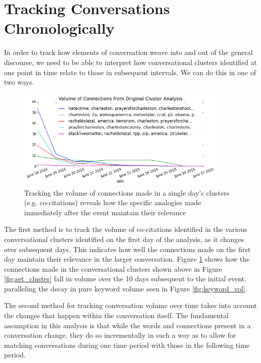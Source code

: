 \documentclass[12pt]{article}
\begin{document}
\section{Tracking Conversations Chronologically}
In order to track how elements of conversation weave into and out of the general discourse, we need to be able to interpret how conversational clusters identified at one point in time relate to those in subsequent intervals. We can do this in one of two ways. 

\begin{figure}[!ht]
  \centering
    \includegraphics[width=0.9\textwidth]{F6_original_clusters_over_time.png}
    \caption{Tracking the volume of connections made in a single day's clusters (e.g. co-citations) reveals how the specific analogies made immediately after the event maintain their relevance}
  \label{fig:cluster_over_time}
\end{figure}

The first method is to track the volume of co-citations identified in the various conversational clusters identified on the first day of the analysis, as it changes over subsequent days. This indicates how well the connections made on the first day maintain their relevance in the larger conversation. Figure \ref{fig:cluster_over_time} shows how the connections made in the conversational clusters shown above in Figure \ref{fig:set_cluster} fall in volume over the 10 days subsequent to the initial event, paralleling the decay in pure keyword volume seen in Figure \ref{fig:keyword_vol}.

The second method for tracking conversation volume over time takes into account the changes that happen within the conversation itself. The fundamental assumption in this analysis is that while the words and connections present in a conversation change, they do so incrementally in such a way as to allow for matching conversations during one time period with those in the following time period. 
\end{document}
